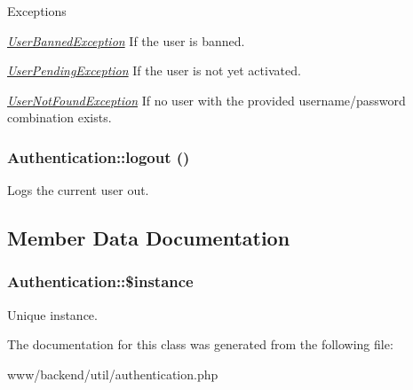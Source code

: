 \begin{DoxyExceptions}{Exceptions}
\item[{\em \hyperlink{classUserBannedException}{UserBannedException}}]If the user is banned. \item[{\em \hyperlink{classUserPendingException}{UserPendingException}}]If the user is not yet activated. \item[{\em \hyperlink{classUserNotFoundException}{UserNotFoundException}}]If no user with the provided username/password combination exists. \end{DoxyExceptions}
\hypertarget{classAuthentication_a478caa2b82260f22462a243fdbabad2f}{
\subsubsection[{logout}]{\setlength{\rightskip}{0pt plus 5cm}Authentication::logout ()}}
\label{classAuthentication_a478caa2b82260f22462a243fdbabad2f}
Logs the current user out. 

\subsection{Member Data Documentation}
\hypertarget{classAuthentication_afc3982cbe2a9766da03e6291249eddb4}{
\subsubsection[{\$instance}]{\setlength{\rightskip}{0pt plus 5cm}Authentication::\$instance}}
\label{classAuthentication_afc3982cbe2a9766da03e6291249eddb4}
Unique instance. 

The documentation for this class was generated from the following file:\begin{DoxyCompactItemize}
\item 
www/backend/util/authentication.php\end{DoxyCompactItemize}
